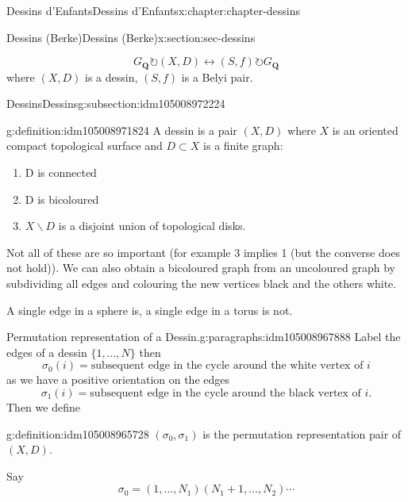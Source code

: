 \documentclass[oneside,10pt,]{book}
\numberwithin{equation}{section}
\newcommand{\QQ}{\mathbf{Q}}
\newcommand{\acts}{\circlearrowright}
\begin{document}
\begin{chapterptx}{Dessins d'Enfants}{}{Dessins d'Enfants}{}{}{x:chapter:chapter-dessins}
\begin{sectionptx}{Dessins (Berke)}{}{Dessins (Berke)}{}{}{x:section:sec-dessins}
\begin{introduction}{}%
%
\begin{equation*}
G_\QQ \acts (X,D) \leftrightarrow (S,f) \acts G_\QQ
\end{equation*}
where \((X,D)\) is a dessin, \((S,f)\) is a Belyi pair.%
\end{introduction}%
%
%
\typeout{************************************************}
\typeout{************************************************}
%
\begin{subsectionptx}{Dessins}{}{Dessins}{}{}{g:subsection:idm105008972224}
\begin{definition}{}{g:definition:idm105008971824}%
A dessin is  a pair \((X,D)\) where \(X\) is an oriented compact topological surface and \(D\subset X\) is a finite graph:%
\begin{enumerate}
\item{}D is connected%
\item{}D is bicoloured%
\item{}\(X \smallsetminus D\) is a disjoint union of topological disks.%
\end{enumerate}
%
\end{definition}
Not all of these are so important (for example 3 implies 1 (but the converse does not hold)). We can also obtain a bicoloured graph from an uncoloured graph by subdividing all edges and colouring the new vertices black and the others white.%
\par
A single edge in a sphere is, a single edge in a torus is not.%
\begin{paragraphs}{Permutation representation of a Dessin.}{g:paragraphs:idm105008967888}%
Label the edges of  a dessin \(\{1, \ldots, N\}\) then%
\begin{equation*}
\sigma_0(i) = \text{subsequent edge in the cycle around the white vertex of }i
\end{equation*}
as we have a positive orientation on the edges%
\begin{equation*}
\sigma_1(i) = \text{subsequent edge in the cycle around the black vertex of }i\text{.}
\end{equation*}
Then we define%
\begin{definition}{}{g:definition:idm105008965728}%
\((\sigma_0, \sigma_1)\) is the permutation representation pair of \((X,D)\).%
\end{definition}
Say%
\begin{equation*}
\sigma_0 = (1 , \ldots, N_1) (N_1 + 1 , \ldots, N_2)\cdots
\end{equation*}

\end{paragraphs}
\end{subsectionptx}
\end{sectionptx}
\end{chapterptx}
\end{document}
